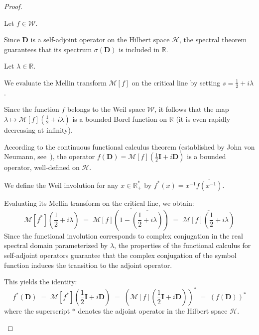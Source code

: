 \documentclass[Riemann_Hypothesis.tex]{subfiles}
\begin{document}
\begin{proof}
    \begin{part_proof}
        Let $f \in \mathcal{W}$. \par
        Since $\mathbf{D}$ is a self-adjoint operator on the Hilbert space $\mathcal{H}$, the spectral theorem guarantees that its spectrum $\sigma(\mathbf{D})$ is included in $\mathbb{R}$. \par
        Let $\lambda \in \mathbb{R}$. \par
        We evaluate the Mellin transform $\mathcal{M}[f]$ on the critical line by setting $s = \frac{1}{2} + i\lambda$. \par
        Since the function $f$ belongs to the Weil space $\mathcal{W}$, it follows that the map $\lambda \mapsto \mathcal{M}[f]\left(\frac{1}{2} + i\lambda\right)$ is a bounded Borel function on $\mathbb{R}$ (it is even rapidly decreasing at infinity). \par
        According to the continuous functional calculus theorem 
        (established by John von Neumann, see~\cite{vonneumann_quantum_en}), the operator $f(\mathbf{D}) = \mathcal{M}[f]\left(\frac{1}{2}\mathbf{I} + i\mathbf{D}\right)$ is a bounded operator, well-defined on $\mathcal{H}$. \par
        We define the Weil involution for any $x \in \mathbb{R}_+^*$ by $f^*(x) = x^{-1} \overline{f(x^{-1})}$. \par
        Evaluating its Mellin transform on the critical line, we obtain:
        \begin{equation*}
            \mathcal{M}[f^*]\left(\frac{1}{2} + i\lambda\right) \;=\; \overline{\mathcal{M}[f]\left(1 - \overline{\left(\frac{1}{2} + i\lambda\right)}\right)} \;=\; \overline{\mathcal{M}[f]\left(\frac{1}{2} + i\lambda\right)}
        \end{equation*}
        Since the functional involution corresponds to complex conjugation in the real spectral domain parameterized by $\lambda$, the properties of the functional calculus for self-adjoint operators guarantee that the complex conjugation of the symbol function induces the transition to the adjoint operator. \par
        This yields the identity:
        \begin{equation*}
            f^*(\mathbf{D}) \;=\; \mathcal{M}[f^*]\left(\frac{1}{2}\mathbf{I} + i\mathbf{D}\right) \;=\; \left( \mathcal{M}[f]\left(\frac{1}{2}\mathbf{I} + i\mathbf{D}\right) \right)^* \;=\; (f(\mathbf{D}))^*
        \end{equation*}
        where the superscript $*$ denotes the adjoint operator in the Hilbert space $\mathcal{H}$. \par

\end{part_proof}
\end{proof}
\end{document}
